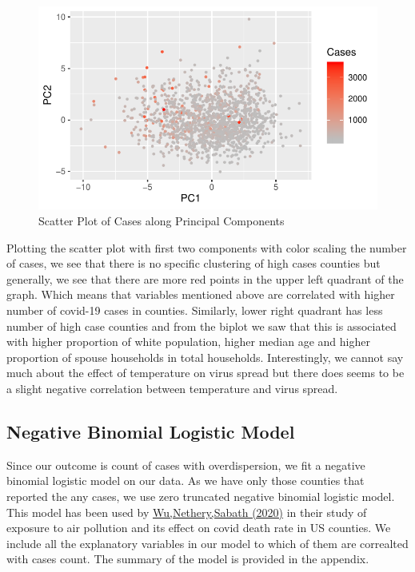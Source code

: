 \documentclass[
]{article}
\begin{document}
\begin{figure}
\centering
\includegraphics{covid_tree_analysis_files/figure-latex/unnamed-chunk-6-1.pdf}
\caption{Scatter Plot of Cases along Principal Components}
\end{figure}

Plotting the scatter plot with first two components with color scaling
the number of cases, we see that there is no specific clustering of high
cases counties but generally, we see that there are more red points in
the upper left quadrant of the graph. Which means that variables
mentioned above are correlated with higher number of covid-19 cases in
counties. Similarly, lower right quadrant has less number of high case
counties and from the biplot we saw that this is associated with higher
proportion of white population, higher median age and higher proportion
of spouse households in total households. Interestingly, we cannot say
much about the effect of temperature on virus spread but there does
seems to be a slight negative correlation between temperature and virus
spread.

\hypertarget{negative-binomial-logistic-model}{%
\subsection{Negative Binomial Logistic
Model}\label{negative-binomial-logistic-model}}

Since our outcome is count of cases with overdispersion, we fit a
negative binomial logistic model on our data. As we have only those
counties that reported the any cases, we use zero truncated negative
binomial logistic model. This model has been used by
\href{https://www.medrxiv.org/node/78162.external-links.html}{Wu,Nethery,Sabath
(2020)} in their study of exposure to air pollution and its effect on
covid death rate in US counties. We include all the explanatory
variables in our model to which of them are correalted with cases count.
The summary of the model is provided in the appendix.
\end{document}
